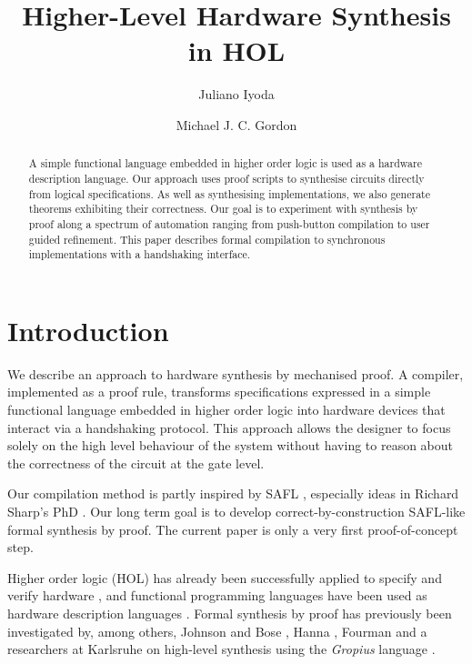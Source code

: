 \documentclass{llncs}
\title{Higher-Level Hardware Synthesis in HOL\\[-4mm]
}
\author{Juliano Iyoda \and  Michael J. C. Gordon}
\institute{University of Cambridge Computer Laboratory \\
           William Gates Building, 15 JJ Thomson Avenue,
           Cambridge CB3 0FD, U.K. \\
           \begin{sl}\{Juliano.Iyoda,Mike.Gordon\}@cl.cam.ac.uk\end{sl}}
\begin{document}
\maketitle

\vspace*{-5mm}
\thispagestyle{empty}

\begin{abstract}
  A simple functional language embedded in higher order logic is used
  as a hardware description language. Our approach uses proof scripts
  to synthesise circuits directly from logical specifications.  As
  well as synthesising implementations, we also generate theorems
  exhibiting their correctness. Our goal is to experiment with
  synthesis by proof along a spectrum of automation ranging from
  push-button compilation to user guided refinement.  This paper
  describes formal compilation to synchronous implementations with a
  handshaking interface.
\vspace*{-2mm}
\end{abstract}

\section{Introduction}
\label{secIntroduction}


We describe an approach to hardware synthesis by mechanised proof.
A compiler, implemented as a proof rule, transforms specifications
expressed in a simple functional language embedded in higher order
logic into hardware devices that interact via a handshaking protocol.
This approach allows the designer to focus solely on the high level
behaviour of the system without having to reason about the correctness
of the circuit at the gate level.

Our compilation method is partly inspired by SAFL \cite{MS01b},
especially ideas in Richard Sharp's PhD \cite{Sha02}. Our long term
goal is to develop correct-by-construction SAFL-like formal synthesis
by proof. The current paper is only a very first proof-of-concept
step.


Higher order logic (HOL) \cite{GM93} has already been successfully
applied to specify and verify hardware \cite{Fox01,Gor86,Mel93}, and
functional programming languages have been used as hardware
description languages \cite{CP02,O'D87,Sha02}.  Formal synthesis by
proof has previously been investigated by, among others, Johnson and
Bose \cite{Johnson90}, Hanna \cite{Hanna92}, Fourman \cite{fourman89b}
and a researchers at Karlsruhe on high-level synthesis using the
{\it Gropius\/} language \cite{Gropius1,Gropius2}. 
\end{document}
